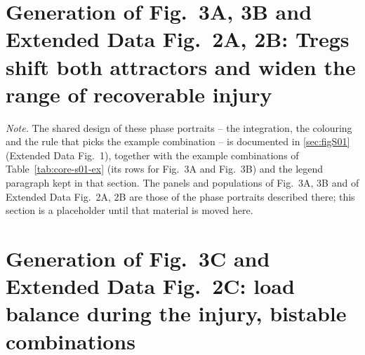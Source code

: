 \documentclass[11pt]{article}
\begin{document}
\section{Generation of Fig.~3A, 3B and Extended Data Fig.~2A, 2B: Tregs shift both attractors and widen the range of recoverable injury}
\label{sec:fig3}


\emph{Note.} The shared design of these phase portraits -- the integration, the
colouring and the rule that picks the example combination -- is documented in
\ref{sec:figS01} (Extended Data Fig.~1), together with the example combinations of
Table~\ref{tab:core-s01-ex} (its rows for Fig.~3A and Fig.~3B) and the legend
paragraph kept in that section. The panels and populations of Fig.~3A, 3B and of
Extended Data Fig.~2A, 2B are those of the phase portraits described there; this
section is a placeholder until that material is moved here.

\section{Generation of Fig.~3C and Extended Data Fig.~2C: load balance during the injury, bistable combinations}
\label{sec:fig4}

\end{document}
